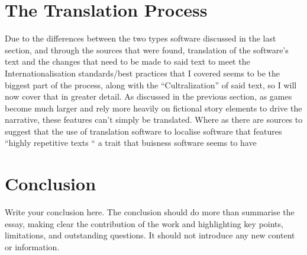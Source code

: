 \documentclass{scrartcl}
\begin{document}
\section{The Translation Process}
Due to the differences between the two types software discussed in the last section, and through the sources that were found, translation of the software's text and the changes that need to be made to said text to meet the Internationalisation standards/best practices that I covered seems to be the biggest part of the process, along with the ``Cultralization'' of said text, so I will now cover that in greater detail. As discussed in the previous section, as games become much larger and rely more heavily on fictional story elements to drive the narrative, these features can't simply be translated. Where as there are sources to suggest that the use of translation software to localise software that features ``highly repetitive texts `` \cite[pg.1]{schaler1994practical} a trait that buisness software seems to have 




\section{Conclusion}

Write your conclusion here. The conclusion should do more than summarise the essay, making clear the contribution of the work and highlighting key points, limitations, and outstanding questions. It should not introduce any new content or information.



\end{document}
